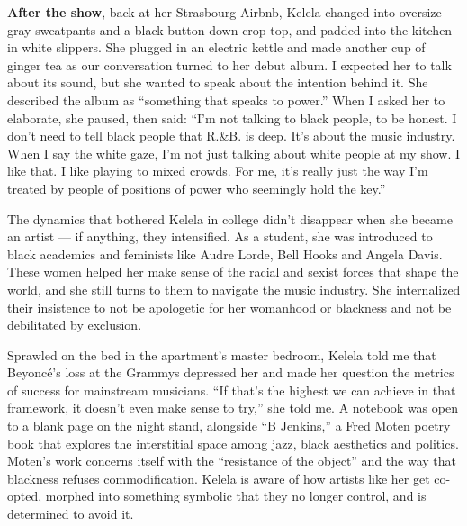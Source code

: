 \textbf{After the show}, back at her Strasbourg Airbnb, Kelela changed
into oversize gray sweatpants and a black button-down crop top, and
padded into the kitchen in white slippers. She plugged in an electric
kettle and made another cup of ginger tea as our conversation turned to
her debut album. I expected her to talk about its sound, but she wanted
to speak about the intention behind it. She described the album as
``something that speaks to power.'' When I asked her to elaborate, she
paused, then said: ``I'm not talking to black people, to be honest. I
don't need to tell black people that R.\&B. is deep. It's about the
music industry. When I say the white gaze, I'm not just talking about
white people at my show. I like that. I like playing to mixed crowds.
For me, it's really just the way I'm treated by people of positions of
power who seemingly hold the key.''

The dynamics that bothered Kelela in college didn't disappear when she
became an artist --- if anything, they intensified. As a student, she
was introduced to black academics and feminists like Audre Lorde, Bell
Hooks and Angela Davis. These women helped her make sense of the racial
and sexist forces that shape the world, and she still turns to them to
navigate the music industry. She internalized their insistence to not be
apologetic for her womanhood or blackness and not be debilitated by
exclusion.

Sprawled on the bed in the apartment's master bedroom, Kelela told me
that Beyoncé's loss at the Grammys depressed her and made her question
the metrics of success for mainstream musicians. ``If that's the highest
we can achieve in that framework, it doesn't even make sense to try,''
she told me. A notebook was open to a blank page on the night stand,
alongside ``B Jenkins,'' a Fred Moten poetry book that explores the
interstitial space among jazz, black aesthetics and politics. Moten's
work concerns itself with the ``resistance of the object'' and the way
that blackness refuses commodification. Kelela is aware of how artists
like her get co-opted, morphed into something symbolic that they no
longer control, and is determined to avoid it.


